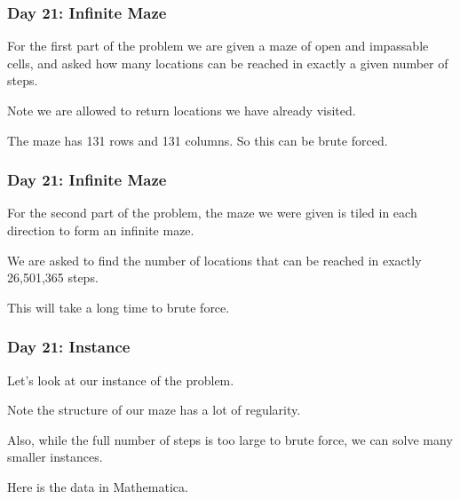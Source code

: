 \begin{frame}
\frametitle{Day 21: Infinite Maze}

For the first part of the problem we are given a maze of open and
impassable cells, and asked how many locations can be reached in exactly
a given number of steps.\vfill

Note we are allowed to return locations we have already visited.\vfill

The maze has 131 rows and 131 columns. So this can be brute forced.
\end{frame}

\begin{frame}
\frametitle{Day 21: Infinite Maze}

For the second part of the problem, the maze we were given is tiled in each direction to form
an infinite maze. \vfill

We are asked to find the number of locations that can be reached in exactly 26,501,365 steps.\vfill

This will take a long time to brute force.

\end{frame}

\begin{frame}
\frametitle{Day 21: Instance}

Let's look at our instance of the problem. \vfill

Note the structure of our maze has a lot of regularity.\vfill

Also, while the full number of steps is too large to brute force,
we can solve many smaller instances.

Here is the data in Mathematica.
\end{frame}
